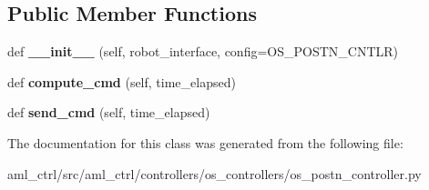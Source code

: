 \subsection*{Public Member Functions}
\begin{DoxyCompactItemize}
\item 
\hypertarget{classaml__ctrl_1_1controllers_1_1os__controllers_1_1os__postn__controller_1_1_o_s_position_controller_a4edd611d5869bc624ac43ca6ea07eb7e}{}\label{classaml__ctrl_1_1controllers_1_1os__controllers_1_1os__postn__controller_1_1_o_s_position_controller_a4edd611d5869bc624ac43ca6ea07eb7e} 
def {\bfseries \+\_\+\+\_\+init\+\_\+\+\_\+} (self, robot\+\_\+interface, config=O\+S\+\_\+\+P\+O\+S\+T\+N\+\_\+\+C\+N\+T\+LR)
\item 
\hypertarget{classaml__ctrl_1_1controllers_1_1os__controllers_1_1os__postn__controller_1_1_o_s_position_controller_abd01c94e42d5f60c598fa7ec68a121dd}{}\label{classaml__ctrl_1_1controllers_1_1os__controllers_1_1os__postn__controller_1_1_o_s_position_controller_abd01c94e42d5f60c598fa7ec68a121dd} 
def {\bfseries compute\+\_\+cmd} (self, time\+\_\+elapsed)
\item 
\hypertarget{classaml__ctrl_1_1controllers_1_1os__controllers_1_1os__postn__controller_1_1_o_s_position_controller_a03e33b163c81755c86e5ba546875b7a3}{}\label{classaml__ctrl_1_1controllers_1_1os__controllers_1_1os__postn__controller_1_1_o_s_position_controller_a03e33b163c81755c86e5ba546875b7a3} 
def {\bfseries send\+\_\+cmd} (self, time\+\_\+elapsed)
\end{DoxyCompactItemize}


The documentation for this class was generated from the following file\+:\begin{DoxyCompactItemize}
\item 
aml\+\_\+ctrl/src/aml\+\_\+ctrl/controllers/os\+\_\+controllers/os\+\_\+postn\+\_\+controller.\+py\end{DoxyCompactItemize}
